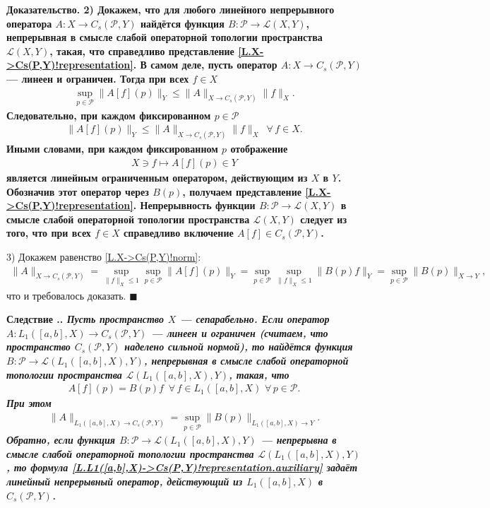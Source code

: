\documentclass{report}
\newcounter{rem}[section]
\newcounter{cor}[section]
\renewcommand{\thecor}{\thesection.\arabic{cor}}
\newenvironment{Corrolary}{\par\refstepcounter{cor}\bf Следствие \thecor. \it}{\rm\par}
\newcounter{theor}[section]
\newenvironment{Proof}{\par\noindent\bf Доказательство.\rm}{ $\blacksquare$\par}
\begin{document}
\begin{Proof}
2) Докажем, что для любого линейного непрерывного оператора $A:X\to C_s(\mathcal{P},Y)$ найдётся функция $B:\mathcal{P}\to\mathcal{L}(X,Y)$, непрерывная в смысле слабой
операторной топологии пространства $\mathcal{L}(X,Y)$, такая, что справедливо представление \eqref{L.X->Cs(P,Y)!representation}. В самом деле, пусть оператор $A:X\to C_s(\mathcal{P},Y)$
--- линеен и ограничен. Тогда при всех $f\in X$
\begin{gather*}
\sup\limits_{p\in\mathcal{P}}\|A[f](p)\|_Y\leqslant\|A\|_{X\to C_s(\mathcal{P},Y)}\|f\|_X.
\end{gather*}
Следовательно, при каждом фиксированном $p\in\mathcal{P}$
\begin{gather*}
\|A[f](p)\|_Y\leqslant\|A\|_{X\to C_s(\mathcal{P},Y)}\|f\|_X\,\,\,\forall\,f\in X.
\end{gather*}
Иными словами, при каждом фиксированном $p$ отображение
\begin{gather*}
X\ni f\mapsto A[f](p)\in Y
\end{gather*}
является линейным ограниченным оператором, действующим из $X$ в $Y$. Обозначив этот оператор через $B(p)$, получаем представление \eqref{L.X->Cs(P,Y)!representation}. Непрерывность функции
$B:\mathcal{P}\to\mathcal{L}(X,Y)$ в смысле слабой операторной топологии пространства $\mathcal{L}(X,Y)$ следует из того, что при всех $f\in X$ справедливо включение
$A[f]\in C_s(\mathcal{P},Y)$.

3) Докажем равенство \eqref{L.X->Cs(P,Y)!norm}:
\begin{gather*}
\|A\|_{X\to C_s(\mathcal{P},Y)}=\sup\limits_{\|f\|_X\leqslant1}\sup\limits_{p\in\mathcal{P}}\|A[f](p)\|_Y=\sup\limits_{p\in\mathcal{P}}\sup\limits_{\|f\|_X\leqslant1}\|B(p)f\|_Y=
\sup\limits_{p\in\mathcal{P}}\|B(p)\|_{X\to Y},
\end{gather*}
что и требовалось доказать.
\end{Proof}

\begin{Corrolary}\label{L.L1([a,b],X)->Cs(P,Y)!theorem.auxiliary}
Пусть пространство $X$ --- сепарабельно. Если оператор $A:L_1([a,b],X)\to C_s(\mathcal{P},Y)$ --- линеен и ограничен (считаем, что пространство $C_s(\mathcal{P},Y)$ наделено сильной
нормой), то найдётся функция $B:\mathcal{P}\to\mathcal{L}(L_1([a,b],X),Y)$, непрерывная в смысле слабой операторной топологии пространства $\mathcal{L}(L_1([a,b],X),Y)$, такая, что
\begin{gather}\label{L.L1([a,b],X)->Cs(P,Y)!representation.auxiliary}
A[f](p)=B(p)f\,\,\,\forall\,f\in L_1([a,b],X)\,\,\forall\,p\in\mathcal{P}.
\end{gather}
При этом
\begin{gather}\label{L.L1([a,b],X)->Cs(P,Y)!norm.auxiliary}
\|A\|_{L_1([a,b],X)\to C_s(\mathcal{P},Y)}=\sup\limits_{p\in\mathcal{P}}\|B(p)\|_{L_1([a,b],X)\to Y}.
\end{gather}
Обратно, если функция $B:\mathcal{P}\to\mathcal{L}(L_1([a,b],X),Y)$ --- непрерывна в смысле слабой операторной топологии пространства $\mathcal{L}(L_1([a,b],X),Y)$, то формула
\eqref{L.L1([a,b],X)->Cs(P,Y)!representation.auxiliary} задаёт линейный непрерывный оператор, действующий из $L_1([a,b],X)$ в $C_s(\mathcal{P},Y)$.
\end{Corrolary}
\end{document}
